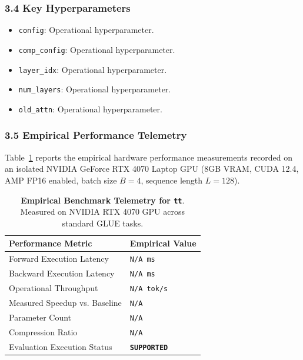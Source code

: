 \subsubsection*{3.4 Key Hyperparameters}
\begin{itemize}
    \item \texttt{config}: Operational hyperparameter.
    \item \texttt{comp\_config}: Operational hyperparameter.
    \item \texttt{layer\_idx}: Operational hyperparameter.
    \item \texttt{num\_layers}: Operational hyperparameter.
    \item \texttt{old\_attn}: Operational hyperparameter.
\end{itemize}

\subsubsection*{3.5 Empirical Performance Telemetry}
Table~\ref{tab:telemetry_tt} reports the empirical hardware performance measurements recorded on an isolated NVIDIA GeForce RTX 4070 Laptop GPU (8GB VRAM, CUDA 12.4, AMP FP16 enabled, batch size $B=4$, sequence length $L=128$).

\begin{table}[h]
\centering
\small
\caption{\textbf{Empirical Benchmark Telemetry for \texttt{tt}}. Measured on NVIDIA RTX 4070 GPU across standard GLUE tasks.}
\label{tab:telemetry_tt}
\begin{tabularx}{\columnwidth}{lX}
\toprule
\textbf{Performance Metric} & \textbf{Empirical Value} \\
\midrule
Forward Execution Latency & \texttt{N/A ms} \\
Backward Execution Latency & \texttt{N/A ms} \\
Operational Throughput & \texttt{N/A tok/s} \\
Measured Speedup vs. Baseline & \texttt{N/A} \\
Parameter Count & \texttt{N/A} \\
Compression Ratio & \texttt{N/A} \\
Evaluation Execution Status & \textbf{\texttt{SUPPORTED}} \\
\bottomrule
\end{tabularx}
\end{table}

